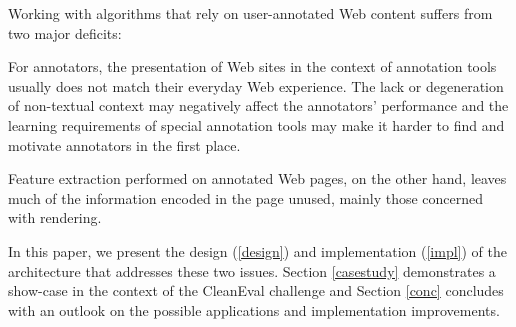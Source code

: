 Working with algorithms that rely on user-annotated Web content suffers from two major deficits:

For annotators, the presentation of Web sites in the context of annotation tools usually does not match their everyday Web experience.
The lack or degeneration of non-textual context may negatively affect the annotators' performance
and the learning requirements of special annotation tools may make it harder to find and motivate annotators in the first place.

Feature extraction performed on annotated Web pages, on the other hand, leaves much of the information encoded in the page unused,
mainly those concerned with rendering.

In this paper, we present the design (\ref{design}) and implementation (\ref{impl}) of the {\KrdWrd} architecture that addresses these two issues.
Section \ref{casestudy} demonstrates a show-case in the context of the CleanEval challenge and Section \ref{conc} concludes with an outlook on the possible applications and implementation improvements.
